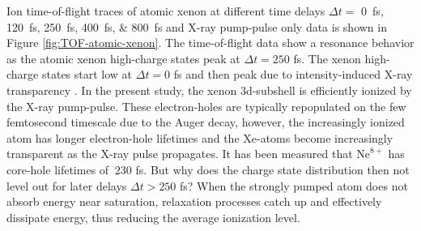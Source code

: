Ion time-of-flight traces of atomic xenon at different time delays $\Delta t =$ \SIlist{0;120;250;400;800}{\femto\second} and X-ray pump-pulse only data is shown in Figure \ref{fig:TOF-atomic-xenon}. The time-of-flight data show a resonance behavior as the atomic xenon high-charge states peak at $\Delta t = 250$ fs. The xenon high-charge states start low at $\Delta t = 0$ fs and then peak due to intensity-induced X-ray transparency \citep{Young-2010-Nature,Schorb-2012-PRL}. In the present study, the xenon 3d-subshell is efficiently ionized by the X-ray pump-pulse. These electron-holes are typically repopulated on the few femtosecond timescale due to the Auger decay, however, the increasingly ionized atom has longer electron-hole lifetimes and the Xe-atoms become increasingly transparent as the X-ray pulse propagates. It has been measured that $\text{Ne}^{8+}$ has core-hole lifetimes of $~230$ fs. But why does the charge state distribution then not level out for later delays $\Delta t > 250$ fs? When the strongly pumped atom does not absorb energy near saturation, relaxation processes catch up and effectively dissipate energy, thus reducing the average ionization level.
